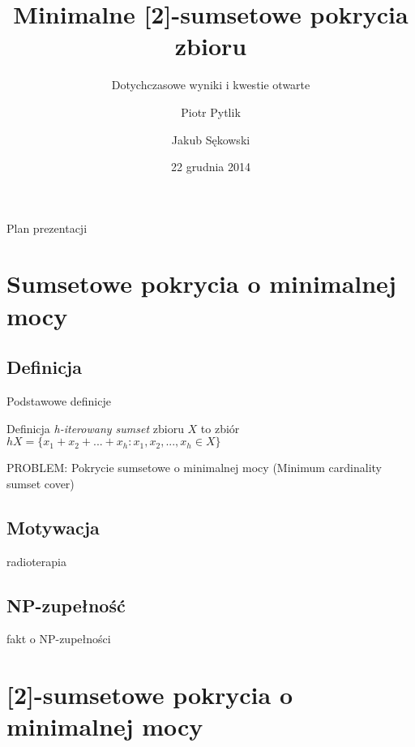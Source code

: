 \documentclass{beamer}
\begin{document}
\title{Minimalne [2]-sumsetowe pokrycia zbioru}
\subtitle{Dotychczasowe wyniki i kwestie otwarte}
\author[Piotr Pytlik \& Jakub Sękowski]{Piotr Pytlik \and Jakub Sękowski}
\date{22 grudnia 2014}

\begin{frame}
	\titlepage
\end{frame}

\begin{frame}{Plan prezentacji}
	\setcounter{tocdepth}{1}
	\tableofcontents
\end{frame}

\section{Sumsetowe pokrycia o minimalnej mocy}
	\subsection{Definicja}
		\begin{frame}{Podstawowe definicje}
			\begin{block}{Definicja}
				\emph{h-iterowany sumset} zbioru $ X $ to zbiór $ hX = \lbrace x_1 + x_2 + ... + x_h : x_1,x_2,...,x_h \in X \rbrace $
			\end{block}
			
			\pause
            \begin{alertblock}{PROBLEM: Pokrycie sumsetowe o minimalnej mocy (Minimum cardinality sumset cover)}
			\end{alertblock}
		\end{frame}
		
	\subsection{Motywacja}
		\begin{frame}
			radioterapia
		\end{frame}	
			
	\subsection{NP-zupełność}
		\begin{frame}
			fakt o NP-zupełności
		\end{frame}
		
\section{[2]-sumsetowe pokrycia o minimalnej mocy}
\end{document}
